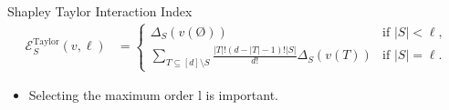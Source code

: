 \documentclass[10pt]{beamer}
\newcommand{\f}{v}
\newcommand{\ex}{\Expl}
\def\Expl{\mathcal{E}}
\begin{document}
\begin{frame}
    \begin{mydefbox}{Shapley Taylor Interaction Index}
        {\small
        \begin{align*}
            \ex_S^{\text{Taylor}}(\f,\ell) &= 
            \begin{cases}
                \Delta_S(\f(\text{\O})) & \text{if } |S| < \ell, \\
                \sum_{T \subseteq [d] \setminus S} \frac{|T|!(d-|T|-1)!|S|}{d!} \Delta_S(\f(T)) & \text{if } |S| = \ell.
            \end{cases}
            \tag{7}
        \end{align*}
        }
    \end{mydefbox}
    \vspace{1.5em}
    \begin{itemize}[label=\scalebox{0.5}{$\blacksquare$}]
        \item Selecting the maximum order l is important.
    \end{itemize}
\end{frame}

\end{document}
